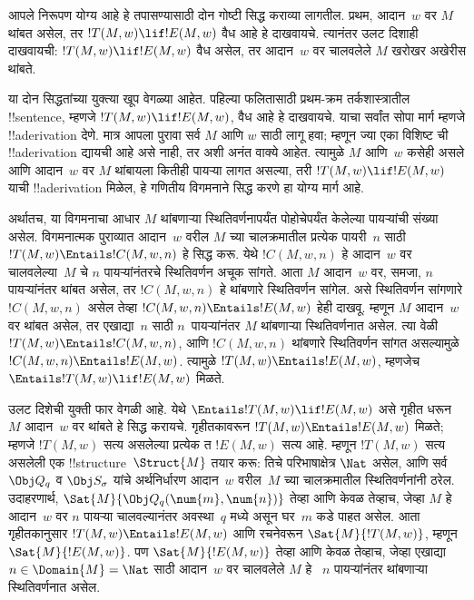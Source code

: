 \documentclass[../../../include/open-logic-section]{subfiles}
\begin{document}

\begin{explain}
आपले निरूपण योग्य आहे हे तपासण्यासाठी दोन
गोष्टी सिद्ध कराव्या लागतील. प्रथम,
आदान~$w$ वर $M$ थांबत असेल, तर
$!T(M, w) \lif !E(M, w)$ वैध आहे
हे दाखवायचे. त्यानंतर उलट दिशाही
दाखवायची: $!T(M, w) \lif !E(M, w)$
वैध असेल, तर आदान~$w$ वर
चालवलेले $M$ खरोखर अखेरीस
थांबते.

या दोन सिद्धतांच्या युक्त्या खूप
वेगळ्या आहेत. पहिल्या फलितासाठी
प्रथम-क्रम तर्कशास्त्रातील
!!{sentence}, म्हणजे
$!T(M, w) \lif !E(M, w)$,
वैध आहे हे दाखवायचे. याचा
सर्वांत सोपा मार्ग म्हणजे
!!a{derivation} देणे.
मात्र आपला पुरावा सर्व $M$
आणि $w$ साठी लागू हवा;
म्हणून ज्या एका विशिष्ट
ची
!!a{derivation}
द्यायची आहे असे नाही,
तर अशी अनंत वाक्ये आहेत.
त्यामुळे $M$ आणि~$w$
कसेही असले आणि आदान~$w$
वर $M$ थांबायला कितीही
पायऱ्या लागत असल्या,
तरी $!T(M, w) \lif !E(M, w)$
याची !!a{derivation}
मिळेल, हे गणितीय विगमनाने
सिद्ध करणे हा योग्य मार्ग आहे.

अर्थातच, या विगमनाचा आधार
$M$ थांबणाऱ्या स्थितिवर्णनापर्यंत
पोहोचेपर्यंत केलेल्या पायऱ्यांची
संख्या असेल. विगमनात्मक पुराव्यात
आदान~$w$ वरील $M$ च्या
चालक्रमातील प्रत्येक पायरी~$n$
साठी $!T(M, w) \Entails !C(M, w, n)$
हे सिद्ध करू. येथे $!C(M, w, n)$
हे आदान~$w$ वर चालवलेल्या~$M$
चे $n$ पायऱ्यांनंतरचे स्थितिवर्णन
अचूक सांगते. आता $M$ आदान~$w$
वर, समजा, $n$ पायऱ्यांनंतर
थांबत असेल, तर $!C(M, w, n)$
हे थांबणारे स्थितिवर्णन सांगेल.
असे स्थितिवर्णन सांगणारे
$!C(M, w, n)$ असेल तेव्हा
$!C(M, w, n) \Entails !E(M, w)$
हेही दाखवू. म्हणून $M$
आदान~$w$ वर थांबत असेल,
तर एखाद्या~$n$ साठी
$n$~पायऱ्यांनंतर $M$
थांबणाऱ्या स्थितिवर्णनात असेल.
त्या वेळी $!T(M, w)
\Entails !C(M, w, n)$,
आणि $!C(M, w, n)$
थांबणारे स्थितिवर्णन सांगत
असल्यामुळे $!C(M, w, n) \Entails !E(M, w)$.
त्यामुळे $!T(M, w) \Entails !E(M, w)$,
म्हणजेच $\Entails !T(M, w)
\lif !E(M, w)$ मिळते.

उलट दिशेची युक्ती फार वेगळी
आहे. येथे $\Entails !T(M, w) \lif !E(M, w)$
असे गृहीत धरून $M$ आदान~$w$
वर थांबते हे सिद्ध करायचे.
गृहीतकावरून $!T(M, w) \Entails !E(M,
w)$ मिळते; म्हणजे $!T(M,
w)$ सत्य असलेल्या प्रत्येक
त
$!E(M, w)$ सत्य आहे.
म्हणून $!T(M, w)$ सत्य
असलेली एक !!{structure}~$\Struct{M}$ तयार करू:
तिचे परिभाषाक्षेत्र $\Nat$
असेल, आणि सर्व $\Obj Q_q$
व $\Obj S_\sigma$ यांचे
अर्थनिर्धारण आदान~$w$
वरील~$M$ च्या चालक्रमातील
स्थितिवर्णनांनी ठरेल.
उदाहरणार्थ,
$\Sat{M}{\Obj Q_q(\num{m}, \num{n})}$
तेव्हा आणि केवळ तेव्हाच, जेव्हा $M$ हे
आदान~$w$ वर $n$ पायऱ्या
चालवल्यानंतर अवस्था~$q$
मध्ये असून घर~$m$ कडे
पाहत असेल. आता गृहीतकानुसार
$!T(M, w) \Entails !E(M, w)$
आणि रचनेवरून
$\Sat{M}{!T(M,
  w)}$, म्हणून
$\Sat{M}{!E(M, w)}$.
पण $\Sat{M}{!E(M, w)}$
तेव्हा आणि केवळ तेव्हाच, जेव्हा एखाद्या
$n \in \Domain{M} = \Nat$
साठी आदान~$w$ वर
चालवलेले $M$ हे
~$n$ पायऱ्यांनंतर
थांबणाऱ्या स्थितिवर्णनात
असेल.
%
\end{explain}
\end{document}
